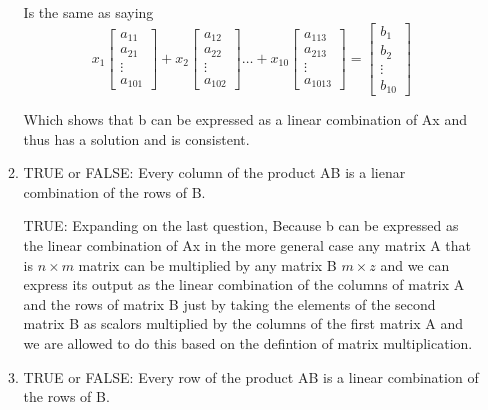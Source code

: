 \documentclass{article}
\begin{document}
\begin{enumerate}
\begin{enumerate}
        Is the same as saying 
        \[
          x_1
          \begin{bmatrix}
            a_{11} \\
            a_{21} \\
            \vdots \\
            a_{101}
          \end{bmatrix}
          + x_2
          \begin{bmatrix}
            a_{12} \\
            a_{22} \\
            \vdots \\
            a_{102}
          \end{bmatrix}
          \dots
          + x_{10}
          \begin{bmatrix}
            a_{113} \\
            a_{213} \\
            \vdots \\
            a_{1013}
          \end{bmatrix}
          =
          \begin{bmatrix}
            b_{1} \\
            b_{2} \\
            \vdots \\
            b_{10}
          \end{bmatrix}
        \]
        \par
        Which shows that b can be expressed as a linear combination of Ax and thus has a solution and is consistent.
        \vspace{0.5cm}
      \item TRUE or FALSE: Every column of the product AB is a lienar combination of the rows of B.
        \vspace{0.5cm}
        \par
        TRUE: Expanding on the last question, Because b can be expressed as the linear combination of Ax in the more general case any matrix A that is $n \times m$ matrix can be multiplied by any matrix B $m \times z$ and we can express its output as the linear combination of the columns of matrix A and the rows of matrix B just by taking the elements of the second matrix B as scalors multiplied by the columns of the first matrix A and we are allowed to do this based on the defintion of matrix multiplication.
        \vspace{0.5cm}
      \item TRUE or FALSE: Every row of the product AB is a linear combination of the rows of B.

\end{enumerate}
\end{enumerate}
\end{document}
